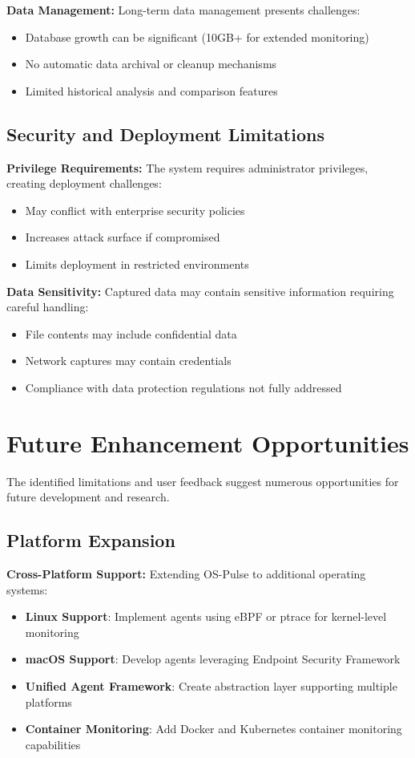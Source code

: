 \textbf{Data Management:}
Long-term data management presents challenges:
\begin{itemize}
    \item Database growth can be significant (10GB+ for extended monitoring)
    \item No automatic data archival or cleanup mechanisms
    \item Limited historical analysis and comparison features
\end{itemize}

\subsection{Security and Deployment Limitations}

\textbf{Privilege Requirements:}
The system requires administrator privileges, creating deployment challenges:
\begin{itemize}
    \item May conflict with enterprise security policies
    \item Increases attack surface if compromised
    \item Limits deployment in restricted environments
\end{itemize}

\textbf{Data Sensitivity:}
Captured data may contain sensitive information requiring careful handling:
\begin{itemize}
    \item File contents may include confidential data
    \item Network captures may contain credentials
    \item Compliance with data protection regulations not fully addressed
\end{itemize}

\section{Future Enhancement Opportunities}

The identified limitations and user feedback suggest numerous opportunities for future development and research.

\subsection{Platform Expansion}

\textbf{Cross-Platform Support:}
Extending OS-Pulse to additional operating systems:
\begin{itemize}
    \item \textbf{Linux Support}: Implement agents using eBPF or ptrace for kernel-level monitoring
    \item \textbf{macOS Support}: Develop agents leveraging Endpoint Security Framework
    \item \textbf{Unified Agent Framework}: Create abstraction layer supporting multiple platforms
    \item \textbf{Container Monitoring}: Add Docker and Kubernetes container monitoring capabilities
\end{itemize}

